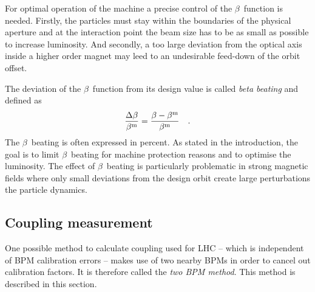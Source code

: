 For optimal operation of the machine a precise control of the $\beta$~function is needed.
Firstly, the particles must stay within the boundaries of the physical aperture and
at the interaction point the beam size has to be as small as possible to increase luminosity.
And secondly, a too large deviation from the optical axis inside a higher order magnet may leed to an undesirable
feed-down of the orbit offset.

The deviation of the $\beta$~function from its design value is called \emph{beta beating} and defined as 
%
\begin{equation}
    \frac{\Delta\beta}{\beta^\text{m}} = \frac{\beta - \beta^\text{m}}{\beta^\text{m}}
    \label{eq_def_beta_beat}
    \quad .
\end{equation}
%
The $\beta$~beating is often expressed in percent.
As stated in the introduction, the goal is to limit $\beta$~beating for machine protection reasons
and to optimise the luminosity.
The effect of $\beta$~beating is particularly problematic in strong magnetic fields where only small
deviations from the design orbit create large perturbations the particle dynamics.

\subsection{Coupling measurement}
\label{sec_coupling_measurement}

One possible method to calculate coupling used for LHC -- which is independent of BPM calibration errors --
makes use of two nearby BPMs in order to cancel out calibration factors. It is therefore called
the \emph{two BPM method}. This method is described in this section.


